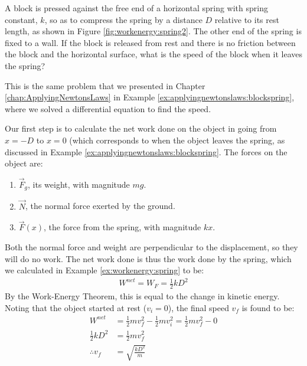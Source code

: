 \begin{example}{A block is pressed against the free end of a horizontal spring with spring constant, $k$, so as to compress the spring by a distance $D$ relative to its rest length, as shown in Figure \ref{fig:workenergy:spring2}. The other end of the spring is fixed to a wall. 
If the block is released from rest and there is no friction between the block and the horizontal surface, what is the speed of the block when it leaves the spring?
}

This is the same problem that we presented in Chapter \ref{chap:ApplyingNewtonsLaws} in Example \ref{ex:applyingnewtonslaws:blockspring}, where we solved a differential equation to find the speed. 

Our first step is to calculate the net work done on the object in going from $x=-D$ to $x=0$ (which corresponds to when the object leaves the spring, as discussed in Example \ref{ex:applyingnewtonslaws:blockspring}. The forces on the object are:
\begin{enumerate}
\item $\vec F_g$, its weight, with magnitude $mg$.
\item $\vec N$, the normal force exerted by the ground.
\item $\vec F(x)$, the force from the spring, with magnitude $kx$. 
\end{enumerate}
Both the normal force and weight are perpendicular to the displacement, so they will do no work. The net work done is thus the work done by the spring, which we calculated in Example \ref{ex:workenergy:spring} to be:
\begin{align*}
W^{net} = W_F = \frac{1}{2}kD^2
\end{align*}
By the Work-Energy Theorem, this is equal to the change in kinetic energy. Noting that the object started at rest ($v_i=0$), the final speed $v_f$ is found to be:
\begin{align*}
W^{net} &=  \frac{1}{2}mv_f^2 - \frac{1}{2}mv_i^2 =  \frac{1}{2}mv_f^2 - 0\\
\frac{1}{2}kD^2 &=\frac{1}{2}mv_f^2\\
\therefore v_f &=\sqrt{\frac{kD^2}{m}}
\end{align*}
\end{example}

